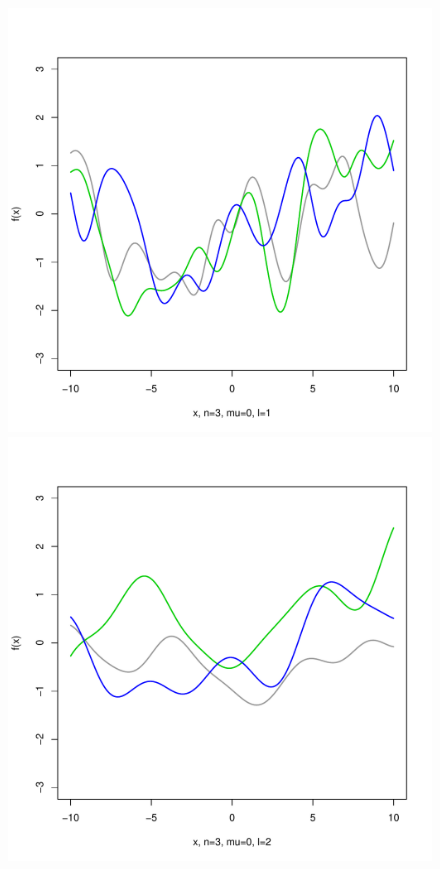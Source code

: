 \documentclass[12pt,letterpaper]{article}
\begin{document}
\begin{figure}
\begin{center}
\includegraphics[scale=0.2]{hw321/n3-m0-l1.pdf}
\includegraphics[scale=0.2]{hw321/n3-m0-l2.pdf}

\end{center}
\end{figure}
\end{document}
